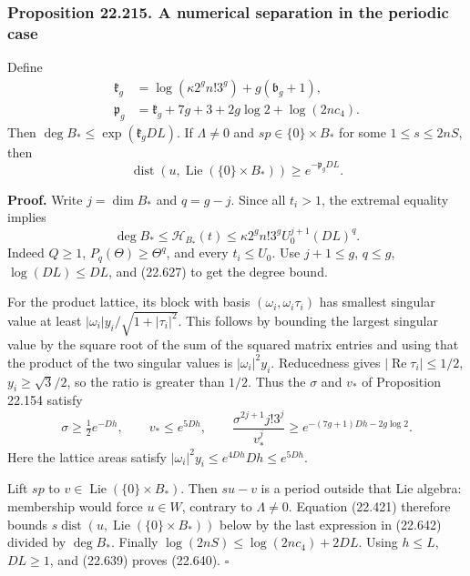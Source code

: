 \documentclass[
  11pt,
  a4paper,
]{article}
\begin{document}
\subsubsection{Proposition 22.215. A numerical separation in the
periodic
case}\label{proposition-22.215.-a-numerical-separation-in-the-periodic-case}

Define \[
 \begin{split}
 \mathfrak k_g&=\log(\kappa2^g n!3^g)+g(\mathfrak b_g+1),\\
 \mathfrak p_g&=\mathfrak k_g+7g+3+2g\log2+\log(2nc_4).
 \end{split}
 \tag{22.639}
\] Then \(\deg B_*\le\exp(\mathfrak k_gDL)\). If \(\Lambda\ne0\) and
\(sp\in\{0\}\times B_*\) for some \(1\le s\le2nS\), then \[
 \operatorname{dist}(u,\operatorname{Lie}(\{0\}\times B_*))
                       \ge e^{-\mathfrak p_gDL}.
 \tag{22.640}
\]

\textbf{Proof.} Write \(j=\dim B_*\) and \(q=g-j\). Since all \(t_i>1\),
the extremal equality implies \[
 \deg B_*\le\mathcal H_{B_*}(t)
 \le\kappa2^g n!3^g U_0^{j+1}(DL)^q.
 \tag{22.641}
\] Indeed \(Q\ge1\), \(P_q(\Theta)\ge\Theta^q\), and every
\(t_i\le U_0\). Use \(j+1\le g\), \(q\le g\), \(\log(DL)\le DL\), and
(22.627) to get the degree bound.

For the product lattice, its block with basis
\((\omega_i,\omega_i\tau_i)\) has smallest singular value at least
\(|\omega_i|y_i/\sqrt{1+|\tau_i|^2}\). This follows by bounding the
largest singular value by the square root of the sum of the squared
matrix entries and using that the product of the two singular values is
\(|\omega_i|^2y_i\). Reducedness gives
\(|\operatorname{Re}\tau_i|\le1/2\), \(y_i\ge\sqrt3/2\), so the ratio is
greater than \(1/2\). Thus the \(\sigma\) and \(v_*\) of Proposition
22.154 satisfy \[
 \sigma\ge\tfrac12e^{-Dh},\qquad
 v_*\le e^{5Dh},\qquad
 \frac{\sigma^{2j+1}j!3^j}{v_*^j}
       \ge e^{-(7g+1)Dh-2g\log2}.
 \tag{22.642}
\] Here the lattice areas satisfy
\(|\omega_i|^2y_i\le e^{4Dh}Dh\le e^{5Dh}\).

Lift \(sp\) to \(v\in\operatorname{Lie}(\{0\}\times B_*)\). Then
\(su-v\) is a period outside that Lie algebra: membership would force
\(u\in W\), contrary to \(\Lambda\ne0\). Equation (22.421) therefore
bounds \(s\operatorname{dist}(u,\operatorname{Lie}(\{0\}\times B_*))\)
below by the last expression in (22.642) divided by \(\deg B_*\).
Finally \(\log(2nS)\le\log(2nc_4)+2DL\). Using \(h\le L\), \(DL\ge1\),
and (22.639) proves (22.640). \(\square\)
\end{document}
